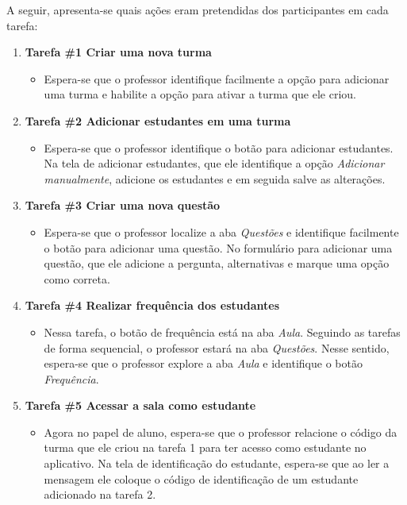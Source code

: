 A seguir, apresenta-se quais ações eram pretendidas dos participantes em cada tarefa:
\begin{enumerate}[label={},leftmargin=*]
  \item \textbf{Tarefa \#1 Criar uma nova turma}
  \begin{itemize}
    \item Espera-se que o professor identifique facilmente a opção para adicionar uma turma e habilite
    a opção para ativar a turma que ele criou.
  \end{itemize}

  \item \textbf{Tarefa \#2 Adicionar estudantes em uma turma}
  \begin{itemize}
    \item Espera-se que o professor identifique o botão para adicionar estudantes. Na tela de adicionar
    estudantes, que ele identifique a opção \textit{Adicionar manualmente}, adicione os estudantes e em seguida
    salve as alterações.
  \end{itemize}

  \item \textbf{Tarefa \#3 Criar uma nova questão}
  \begin{itemize}
    \item Espera-se que o professor localize a aba \textit{Questões} e identifique facilmente
    o botão para adicionar uma questão. No formulário para adicionar uma questão, que ele
    adicione a pergunta, alternativas e marque uma opção como correta.
  \end{itemize}

  \item \textbf{Tarefa \#4 Realizar frequência dos estudantes}
  \begin{itemize}
    \item Nessa tarefa, o botão de frequência está na aba \textit{Aula}. Seguindo as tarefas de forma
    sequencial, o professor estará na aba \textit{Questões}. Nesse sentido, espera-se
    que o professor explore a aba \textit{Aula} e identifique o botão \textit{Frequência}.
  \end{itemize}

  \item \textbf{Tarefa \#5 Acessar a sala como estudante}
  \begin{itemize}
    \item Agora no papel de aluno, espera-se que o professor relacione o código da turma que
    ele criou na tarefa 1 para ter acesso como estudante no aplicativo. Na tela de identificação do estudante,
    espera-se que ao ler a mensagem ele coloque o código de identificação de um estudante adicionado na tarefa 2.
  \end{itemize}


\end{enumerate}
